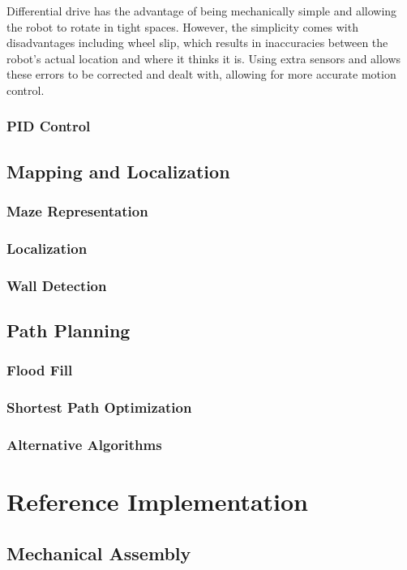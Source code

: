 \documentclass[11pt]{report}
\begin{document}
	\noindent
	Differential drive has the advantage of being mechanically simple and allowing the robot to rotate in tight spaces. However,
	the simplicity comes with disadvantages including wheel slip, which results in inaccuracies between the robot's actual location and
	where it thinks it is. Using extra sensors and  allows these errors to be corrected and dealt with, allowing 
	for more accurate motion control.

    \section{PID Control} \label{sec:pid_control}

\chapter{Mapping and Localization}
    \section{Maze Representation}
    \section{Localization}
    \section{Wall Detection}

\chapter{Path Planning}
    \section{Flood Fill}
    \section{Shortest Path Optimization}
    \section{Alternative Algorithms}

\part{Reference Implementation}

\chapter{Mechanical Assembly}
\end{document}
